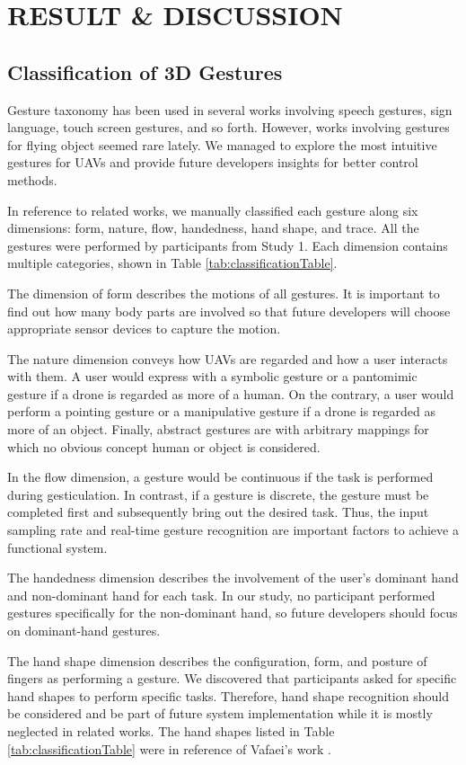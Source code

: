 \documentclass{sigchi}
\begin{document}
\section{RESULT \& DISCUSSION}

\subsection{Classification of 3D Gestures}
Gesture taxonomy has been used in several works involving speech gestures, sign language, touch screen gestures, and so forth. However, works involving gestures for flying object seemed rare lately. We managed to explore the most intuitive gestures for UAVs and provide future developers insights for better control methods.

In reference to related works, we manually classified each gesture along six dimensions: form, nature, flow, handedness, hand shape, and trace. All the gestures were performed by participants from Study 1. Each dimension contains multiple categories, shown in Table \ref{tab:classificationTable}.

The dimension of form describes the motions of all gestures. It is important to find out how many body parts are involved so that future developers will choose appropriate sensor devices to capture the motion.

The nature dimension conveys how UAVs are regarded and how a user interacts with them. A user would express with a symbolic gesture or a pantomimic gesture if a drone is regarded as more of a human. On the contrary, a user would perform a pointing gesture or a manipulative gesture if a drone is regarded as more of an object. Finally, abstract gestures are with arbitrary mappings for which no obvious concept human or object is considered.

In the flow dimension, a gesture would be continuous if the task is performed during gesticulation. In contrast, if a gesture is discrete, the gesture must be completed first and subsequently bring out the desired task. Thus, the input sampling rate and real-time gesture recognition are important factors to achieve a functional system.

The handedness dimension describes the involvement of the user's dominant hand and non-dominant hand for each task. In our study, no participant performed gestures specifically for the non-dominant hand, so future developers should focus on dominant-hand gestures.

The hand shape dimension describes the configuration, form, and posture of fingers as performing a gesture. We discovered that participants asked for specific hand shapes to perform specific tasks. Therefore, hand shape recognition should be considered and be part of future system implementation while it is mostly neglected in related works. The hand shapes listed in Table \ref{tab:classificationTable} were in reference of Vafaei's work \cite{Vafaei:2013}.
\end{document}
